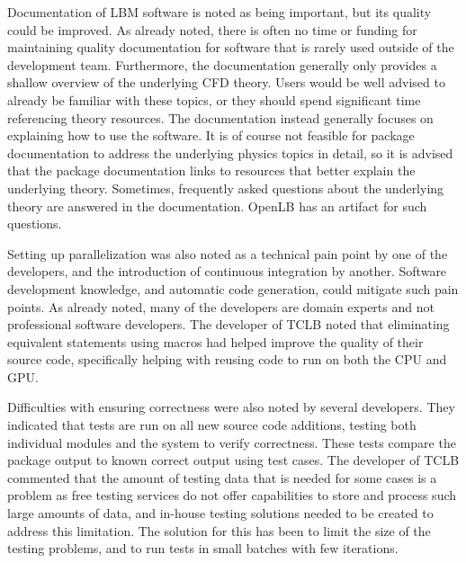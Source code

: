 \documentclass[12pt, notitlepage]{article}
\begin{document}
Documentation of LBM software is noted as being important, but its quality could be improved. As already noted, there is often no time or funding for maintaining quality documentation for software that is rarely used outside of the development team. Furthermore, the documentation generally only provides a shallow overview of the underlying CFD theory. Users would be well advised to already be familiar with these topics, or they should spend significant time referencing theory resources. The documentation instead generally focuses on explaining how to use the software. It is of course not feasible for package documentation to address the underlying physics topics in detail, so it is advised that the package documentation links to resources that better explain the underlying theory. Sometimes, frequently asked questions about the underlying theory are answered in the documentation. OpenLB has an artifact for such questions.

Setting up parallelization was also noted as a technical pain point by one of the developers, and the introduction of continuous integration by another. Software development knowledge, and automatic code generation, could mitigate such pain points. As already noted, many of the developers are domain experts and not professional software developers. The developer of TCLB noted that eliminating equivalent statements using macros had helped improve the quality of their source code, specifically helping with reusing code to run on both the CPU and GPU. 

Difficulties with ensuring correctness were also noted by several developers. They indicated that tests are run on all new source code additions, testing both individual modules and the system to verify correctness. These tests compare the package output to known correct output using test cases. The developer of TCLB commented that the amount of testing data that is needed for some cases is a problem as free testing services do not offer capabilities to store and process such large amounts of data, and in-house testing solutions needed to be created to address this limitation. The solution for this has been to limit the size of the testing problems, and to run tests in small batches with few iterations.
\end{document}
